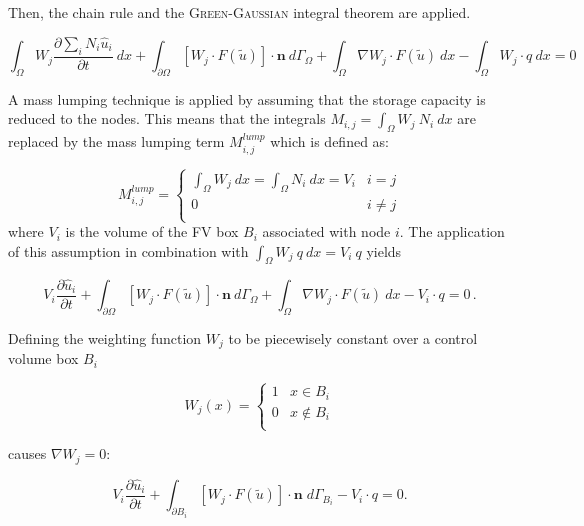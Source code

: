 Then, the chain rule and the \textsc{Green-Gaussian} integral theorem are applied.

\begin{equation}
	\int_\Omega W_j \frac{\partial \sum_i N_i \hat u_i}{\partial t} \: dx
	+ \int_{\partial\Omega}  \left[ W_j \cdot F(\tilde u)\right]
	\cdot \mathbf n \: d\varGamma_\Omega + \int_\Omega  \nabla W_j \cdot F(\tilde u)
	\: dx - \int_\Omega W_j \cdot q \: dx = 0
\end{equation}

A mass lumping technique is applied by assuming that the storage capacity is
reduced to the nodes. This means that the integrals $M_{i,j} = \int_\Omega W_j \: N_i \: dx$
are replaced by the mass lumping term $M^{lump}_{i,j}$ which is defined as:

\begin{equation}
	 M^{lump}_{i,j} =\begin{cases} \int_\Omega W_j \: dx = \int_\Omega N_i \: dx = V_i &i = j\\
	0 &i \neq j\\
	         \end{cases}
\end{equation}
where $V_i$ is the volume of the FV box $B_i$ associated with node $i$.
The application of this assumption in combination with
$\int_\Omega W_j \:q \: dx = V_i \: q$ yields

\begin{equation}
	V_i \frac{\partial \hat u_i}{\partial t}
	+ \int_{\partial\Omega}  \left[ W_j \cdot F(\tilde u)\right]
	\cdot \mathbf n \: d\varGamma_\Omega + \int_\Omega  \nabla W_j \cdot F(\tilde u)
	\: dx- V_i \cdot q = 0 \, .
\end{equation}

Defining the weighting function $W_j$ to be piecewisely constant over a
control volume box $B_i$

\begin{equation}
	W_j(x) = \begin{cases}
	          1 &x \in B_i \\
		  0 &x \notin B_i\\
	         \end{cases}
\end{equation}

causes $\nabla W_j = 0$:

\begin{equation}
\label{eq:disc1}
	V_i \frac{\partial \hat u_i}{\partial t}
	+ \int_{\partial B_i}  \left[ W_j \cdot F(\tilde u)\right]
	\cdot \mathbf n  \;  d{\varGamma}_{B_i} - V_i \cdot q = 0 .
\end{equation}

